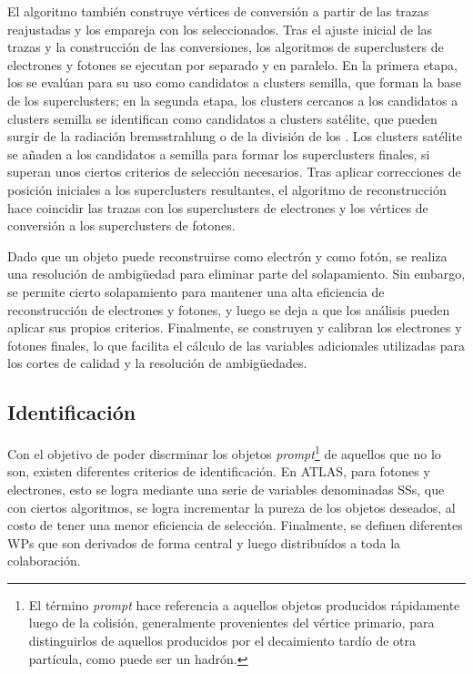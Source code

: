 El algoritmo también construye vértices de conversión a partir de las trazas reajustadas y los empareja con los \topos seleccionados.
Tras el ajuste inicial de las trazas y la construcción de las conversiones, los algoritmos de superclusters de electrones y fotones se ejecutan por separado y en paralelo. En la primera etapa, los \topos se evalúan para su uso como candidatos a clusters semilla, que forman la base de los superclusters; en la segunda etapa, los clusters cercanos a los candidatos a clusters semilla se identifican como candidatos a clusters satélite, que pueden surgir de la radiación bremsstrahlung o de la división de los \topos. Los clusters satélite se añaden a los candidatos a semilla para formar los superclusters finales, si superan unos ciertos criterios de selección necesarios.
Tras aplicar correcciones de posición iniciales a los superclusters resultantes, el algoritmo de reconstrucción hace coincidir las trazas con los superclusters de electrones y los vértices de conversión a los superclusters de fotones.

Dado que un objeto puede reconstruirse como electrón y como fotón, se realiza una resolución de ambigüedad para eliminar parte del solapamiento. Sin embargo, se permite cierto solapamiento para mantener una alta eficiencia de reconstrucción de electrones y fotones, y luego se deja a que los análisis pueden aplicar sus propios criterios. Finalmente, se construyen y calibran los electrones y fotones finales, lo que facilita el cálculo de las variables adicionales utilizadas para los cortes de calidad y la resolución de ambigüedades.



\subsection{Identificaci\'on}
\label{subsec:objects:egamma:id}

Con el objetivo de poder discrminar los objetos \textit{prompt}\footnote{El término \textit{prompt} hace referencia a aquellos objetos producidos rápidamente luego de la colisión, generalmente provenientes del vértice primario, para distinguirlos de aquellos producidos por el decaimiento tardío de otra partícula, como puede ser un hadrón.} de aquellos que no lo son, existen diferentes criterios de identificaci\'on. En \ac{ATLAS}, para fotones y electrones, esto se logra mediante una serie de variables denominadas \acfp{SS}, que con ciertos algoritmos, se logra incrementar la pureza de los objetos deseados, al costo de tener una menor eficiencia de selecci\'on. Finalmente, se definen diferentes \acp{WP} que son derivados de forma central y luego distribu\'idos a toda la colaboraci\'on.

